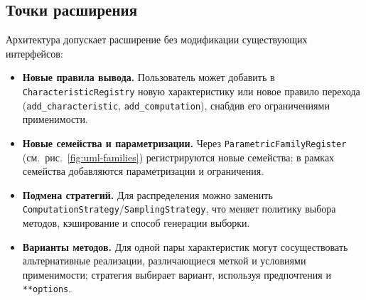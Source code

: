 \subsection{Точки расширения}

Архитектура допускает расширение без модификации существующих интерфейсов:
\begin{itemize}[compact]
      \item \textbf{Новые правила вывода.} Пользователь может добавить в \texttt{CharacteristicRegistry} новую характеристику или новое правило перехода (\texttt{add\_characteristic}, \texttt{add\_computation}), снабдив его ограничениями применимости.
      \item \textbf{Новые семейства и параметризации.} Через \texttt{ParametricFamilyRegister} (см.~рис.~\ref{fig:uml-families}) регистрируются новые семейства; в рамках семейства добавляются параметризации и ограничения.
      \item \textbf{Подмена стратегий.} Для распределения можно заменить \texttt{ComputationStrategy}/\texttt{SamplingStrategy}, что меняет политику выбора методов, кэширование и способ генерации выборки.
      \item \textbf{Варианты методов.} Для одной пары характеристик могут сосуществовать альтернативные реализации, различающиеся меткой и условиями применимости; стратегия выбирает вариант, используя предпочтения и \texttt{**options}.
\end{itemize}
